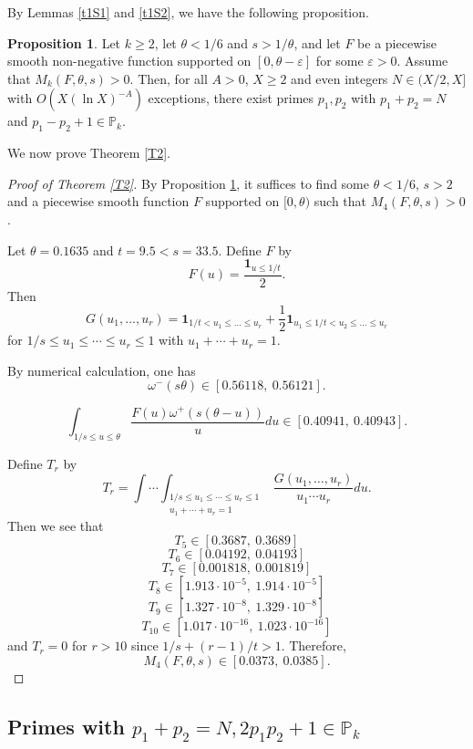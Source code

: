 \documentclass{amsart}
\theoremstyle{definition}
\newtheorem{prop}[dfn]{Proposition}
\theoremstyle{remark}
\newcommand{\1}{
    \bm{1}
}
\begin{document}
By Lemmas \ref{t1S1} and \ref{t1S2}, we have the following proposition. 
\begin{prop}\label{propt1}
Let $k \geq 2$, let $\theta<1/6$ and $s>1/\theta$, and let $F$ be a piecewise smooth non-negative function supported on $[0,\theta-\varepsilon]$ for some $\varepsilon>0$. Assume that $M_k(F,\theta,s)>0$.
Then, for all $A>0$, $X \geq 2$ and even integers $N \in (X/2,X]$ with $O(X(\ln{X})^{-A})$ exceptions, there exist primes $p_1,p_2$ with $p_1+p_2=N$ and $p_1-p_2+1 \in \mathbb{P}_k$. 
\end{prop}


We now prove Theorem \ref{T2}. 

\begin{proof}[Proof of Theorem \ref{T2}]
By Proposition \ref{propt1}, it suffices to find some $\theta<1/6$, $s>2$ and a piecewise smooth function $F$ supported on $[0,\theta)$ such that $M_4(F,\theta,s)>0$. 


Let $\theta=0.1635$ and $t= 9.5< s= 33.5$. Define $F$ by
\[ F(u) = \frac{\1_{u \leq 1/t}}{2}. \]
Then
\begin{equation} G(u_1,\ldots,u_r) = \1_{1/t < u_1 \leq \ldots \leq u_r} + \frac{1}{2} \1_{u_1 \leq 1/t < u_2 \leq \ldots \leq u_r} \label{Ghalf} \end{equation}
for $1/s \leq u_1 \leq \cdots \leq u_r \leq 1$ with $u_1+\cdots+u_r=1$. 

By numerical calculation, one has
\[ \omega^-(s\theta) \in[0.56118,\ 0.56121]. \]

\[ \int_{1/s \leq u \leq \theta} \frac{F(u) \omega^+(s(\theta-u))}{u} du \in[0.40941,\ 0.40943]. \]

Define $T_r$ by
\[ T_r = \int \cdots \int_{\substack{1/s \leq u_1 \leq \cdots \leq u_r \leq 1 \\ u_1 + \cdots + u_r = 1}} \frac{G(u_1, \ldots, u_r)}{u_1 \cdots u_r} du. \]
Then we see that
\[ T_5 \in [0.3687,\ 0.3689] \]
\[ T_6 \in [0.04192,\ 0.04193] \]
\[ T_7 \in [0.001818,\ 0.001819] \]
\[ T_8 \in [1.913{\cdot}10^{-5},\ 1.914{\cdot}10^{-5}] \]
\[ T_9 \in [1.327{\cdot}10^{-8},\ 1.329{\cdot}10^{-8}] \]
\[ T_{10} \in [1.017{\cdot}10^{-16},\ 1.023{\cdot}10^{-16}] \]
and $T_{r}=0$ for $r>10$ since $1/s + (r-1)/t>1$. 
Therefore, 
\[ M_4(F,\theta,s) \in [0.0373,\ 0.0385]. \]

\end{proof}



\subsection{Primes with $p_1+p_2=N, 2p_1 p_2+1 \in \mathbb{P}_k$}
\end{document}
